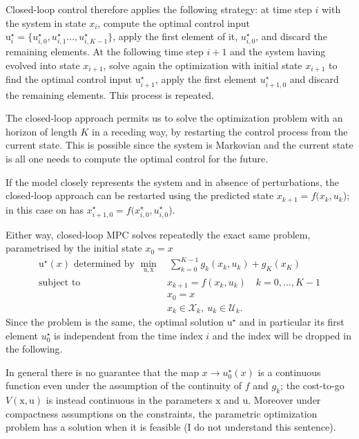 \documentclass[11pt]{report}
\newcommand{\bs}[1]{\boldsymbol{#1}}
\newcommand{\bsu}{\bs{\mathrm{u}}}
\newcommand{\bsx}{\bs{\mathrm{x}}}
\begin{document}
Closed-loop control therefore applies the following strategy: at time step $i$ with the system in state $x_i$, compute the optimal control input $\bsu_i^\star=\{u_{i,0}^\star,u_{i,1}^\star\ldots,u_{i,K-1}^\star\}$, apply the first element of it, $u_{i,0}^\star$, and discard the remaining elements. At the following time step $i+1$ and the system having evolved into state $x_{i+1}$, solve again the optimization with initial state $x_{i+1}$ to find the optimal control input $\bsu_{i+1}^\star$, apply the first element $u_{i+1,0}^\star$ and discard the remaining elements. This process is repeated.

The closed-loop approach permits us to solve the optimization problem with an horizon of length $K$ in a receding way, by restarting the control process from the current state. This is possible since the system is Markovian and the current state is all one needs to compute the optimal control for the future.

If the model closely represents the system and in absence of perturbations, the closed-loop approach can be restarted using the predicted state $x_{k+1} = f(x_k,u_k$); in this case on has $x_{i+1,0}^\star = f(x_{i,0}^\star,u_{i,0}^\star$).

Either way, closed-loop MPC solves repeatedly the exact same problem, parametrised by the initial state $x_0=x$
\begin{align*}
  \bsu^\star(x) \text{ determined by } \min_{\bsu, \bsx} &\ \sum_{k=0}^{K-1}g_k(x_k, u_k) + g_K(x_K)\\
  \text{subject to } & x_{k+1} = f(x_k,u_k)\quad k=0,\ldots,K-1 \\
                                                         & x_0 = x \\
                                                         & x_k \in \mathcal{X}_k,\ u_k \in \mathcal{U}_k.
\end{align*}
Since the problem is the same, the optimal solution $\bsu^\star$ and in particular its first element $u_0^\star$ is independent from the time index $i$ and the index will be dropped in the following.

In general there is no guarantee that the map $x \rightarrow u_0^\star(x)$ is a continuous function even under the assumption of the continuity of $f$ and $g_k$; the cost-to-go $V(\bsx,\bsu)$ is instead continuous in the parameters $\bsx$ and $\bsu$. Moreover under compactness assumptions on the constraints, the parametric optimization problem has a solution when it is feasible (I do not understand this sentence).
\end{document}
